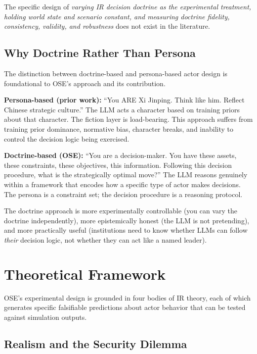 \documentclass[12pt, a4paper]{article}
\begin{document}
The specific design of \textit{varying IR decision doctrine as the experimental treatment, holding world state and scenario constant, and measuring doctrine fidelity, consistency, validity, and robustness} does not exist in the literature.

\subsection{Why Doctrine Rather Than Persona}

The distinction between doctrine-based and persona-based actor design is foundational to OSE's approach and its contribution.

\textbf{Persona-based (prior work):} ``You ARE Xi Jinping. Think like him. Reflect Chinese strategic culture.'' The LLM acts a character based on training priors about that character. The fiction layer is load-bearing. This approach suffers from training prior dominance, normative bias, character breaks, and inability to control the decision logic being exercised.

\textbf{Doctrine-based (OSE):} ``You are a decision-maker. You have these assets, these constraints, these objectives, this information. Following this decision procedure, what is the strategically optimal move?'' The LLM reasons genuinely within a framework that encodes how a specific type of actor makes decisions. The persona is a constraint set; the decision procedure is a reasoning protocol.

The doctrine approach is more experimentally controllable (you can vary the doctrine independently), more epistemically honest (the LLM is not pretending), and more practically useful (institutions need to know whether LLMs can follow \textit{their} decision logic, not whether they can act like a named leader).

\section{Theoretical Framework}

OSE's experimental design is grounded in four bodies of IR theory, each of which generates specific falsifiable predictions about actor behavior that can be tested against simulation outputs.

\subsection{Realism and the Security Dilemma}
\end{document}
